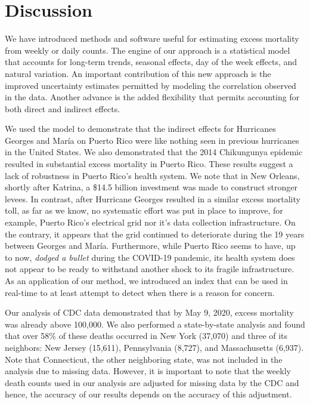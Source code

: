 \documentclass[11pt]{article}
\begin{document}
\section{Discussion}
We have introduced methods and software useful for estimating excess mortality from weekly or daily counts. The engine of our approach is a statistical model that accounts for long-term trends, seasonal effects, day of the week effects, and natural variation. An important contribution of this new approach is the improved uncertainty estimates permitted by modeling the correlation observed in the data. Another advance is the added flexibility that permits accounting for both direct and indirect effects.

We used the model to demonstrate that the indirect effects for Hurricanes Georges and Mar\'ia on Puerto Rico were like nothing seen in previous hurricanes in the United States. We also demonstrated that the 2014 Chikungunya epidemic resulted in substantial excess mortality in Puerto Rico. These results suggest a lack of robustness in Puerto Rico's health system. We note that in New Orleans, shortly after Katrina, a \$14.5 billion investment was made to construct stronger levees\cite{kates2006reconstruction, interagency2007performance, adelson2018}. In contrast, after Hurricane Georges resulted in a similar excess mortality toll, as far as we know, no systematic effort was put in place to improve, for example, Puerto Rico’s electrical grid nor it's data collection infrastructure. On the contrary, it appears that the grid continued to deteriorate during the 19 years between Georges and Mar\'ia. Furthermore, while Puerto Rico seems to have, up to now, \emph{dodged a bullet} during the COVID-19 pandemic, its health system does not appear to be ready to withstand another shock to its fragile infrastructure. As an application of our method, we introduced an index that can be used in real-time to at least attempt to detect when there is a reason for concern.

Our analysis of CDC data demonstrated that by May 9, 2020, excess mortality was already above 100,000. We also performed a state-by-state analysis and found that over 58\% of these deaths occurred in New York (37,070) and three of its neighbors: New Jersey (15,611), Pennsylvania (8,727), and Massachusetts (6,937). Note that Connecticut, the other neighboring state, was not included in the analysis due to missing data. However, it is important to note that the weekly death counts used in our analysis are adjusted for missing data by the CDC \cite{cdc2020covid19} and hence, the accuracy of our results depends on the accuracy of this adjustment.
\end{document}
